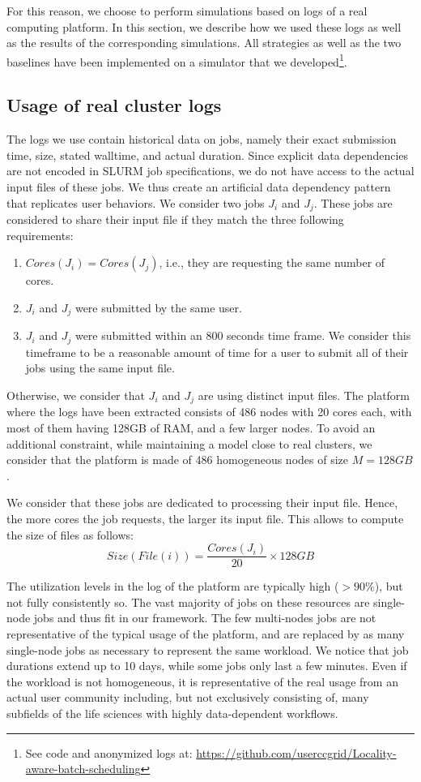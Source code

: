 \documentclass[sigconf,review,anonymous]{acmart}
\newcommand{\file}{\ensuremath{\mathit{File}}\xspace}
\newcommand{\size}{\ensuremath{\mathit{Size}}\xspace}
\newcommand{\memory}{\ensuremath{\mathit{M}}\xspace}
\newcommand{\core}{\mathit{Cores}\xspace}
\begin{document}
For this reason, we choose to perform simulations based on logs of a
real computing platform. In this section, we describe how we used
these logs as well as the results of the corresponding simulations.
All strategies as well as the two baselines have been implemented on
a simulator that we developed\footnote{See code and anonymized logs at: \url{https://github.com/userccgrid/Locality-aware-batch-scheduling}}.


\subsection{Usage of real cluster logs}
\label{sec.working}
The logs we use contain historical data on jobs, namely their exact submission time,
size, stated walltime, and actual duration.
Since explicit data dependencies are not encoded in SLURM job
specifications, we do not have access to the actual input files of
these jobs. We thus create an artificial data dependency pattern that
replicates user behaviors.
We consider two jobs $J_i$ and $J_j$. These jobs are considered to
share their input file if they match the three following requirements:
\begin{enumerate}
	\item $\core(J_i) = \core(J_j)$, i.e., they are requesting the same number of cores.
	\item $J_i$ and $J_j$ were submitted by the same user.
	\item $J_i$ and $J_j$ were submitted within an 800 seconds
          time frame. We consider this timeframe to be a reasonable amount of time for a user to submit all of their jobs using the same input file.
\end{enumerate}
Otherwise, we consider that $J_i$ and $J_j$ are using distinct input files. 
% 
The platform where the logs have been extracted
consists of 486 nodes with 20 cores each, with most of them
having 128GB of RAM, and a few larger nodes.
To avoid an additional constraint, while maintaining a model close to real clusters,
we consider that the platform is made of 486 homogeneous nodes of size $\memory = 128GB$.

We consider that these jobs are dedicated to processing their input
file. Hence, the more cores the job requests, 
the larger its input file. This allows to compute the size of files as follows:
$$\size(\file(i)) =\frac{\core(J_i)}{20} \times 128GB$$

The utilization levels in the log of the platform are typically high ($>90\%$), but
not fully consistently so. The vast majority of jobs on these
resources are single-node jobs and thus fit in our framework.
The few multi-nodes jobs are not representative of the typical usage
of the platform, and are replaced by as many single-node jobs as necessary to represent the same workload.
We notice that job
durations extend up to 10 days, while some jobs only last a few
minutes. Even if the workload is not homogeneous, it is representative
of the real usage from an actual user community including, but not exclusively consisting of, many subfields of the life sciences with highly data-dependent workflows.
\end{document}
